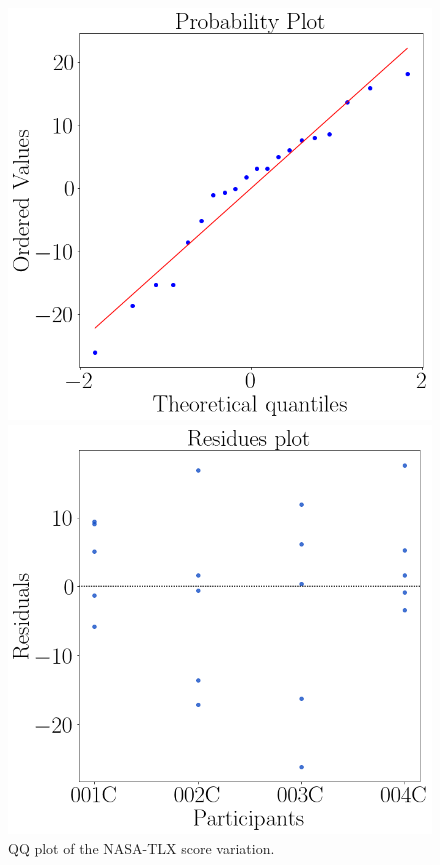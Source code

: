         \begin{figure}[!htb]
            \begin{minipage}{0.45\linewidth}
                \centering
                \includegraphics[width = \linewidth]{Resultados/Nasa/Figuras/png/qqplot_nasa_var.png}
                \caption{QQ plot of the NASA-TLX score variation.}
                \label{fig:qqplot_sdnn_average}
            \end{minipage}
            \begin{minipage}{0.1\linewidth}
                \hfill
            \end{minipage}
            \begin{minipage}{0.45\linewidth}
                \centering
                \includegraphics[width = \linewidth]{Resultados/Nasa/Figuras/png/residplot_nasa_var.png}

\end{minipage}
\end{figure}
